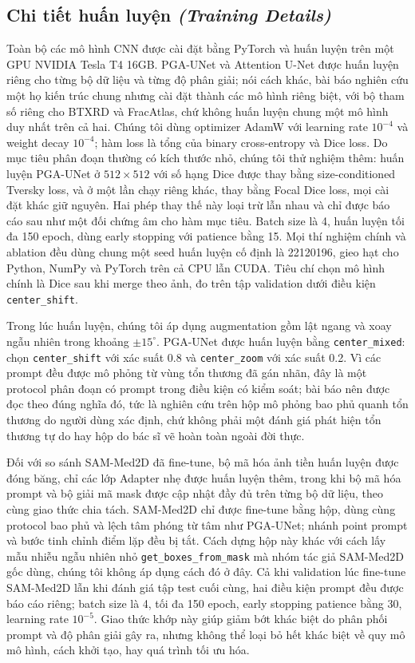 \documentclass[11pt]{article}
\newcommand{\enlabel}[1]{{\small\itshape\color{gray} (#1)}}
\begin{document}
\subsection{Chi tiết huấn luyện \enlabel{Training Details}}
\label{sec:training}
Toàn bộ các mô hình CNN được cài đặt bằng PyTorch và huấn luyện trên một GPU NVIDIA Tesla T4 16GB. PGA-UNet và Attention U-Net được huấn luyện riêng cho từng bộ dữ liệu và từng độ phân giải; nói cách khác, bài báo nghiên cứu một họ kiến trúc chung nhưng cài đặt thành các mô hình riêng biệt, với bộ tham số riêng cho BTXRD và FracAtlas, chứ không huấn luyện chung một mô hình duy nhất trên cả hai. Chúng tôi dùng optimizer AdamW với learning rate $10^{-4}$ và weight decay $10^{-4}$; hàm loss là tổng của binary cross-entropy và Dice loss. Do mục tiêu phân đoạn thường có kích thước nhỏ, chúng tôi thử nghiệm thêm: huấn luyện PGA-UNet ở $512\times512$ với số hạng Dice được thay bằng size-conditioned Tversky loss, và ở một lần chạy riêng khác, thay bằng Focal Dice loss, mọi cài đặt khác giữ nguyên. Hai phép thay thế này loại trừ lẫn nhau và chỉ được báo cáo sau như một đối chứng âm cho hàm mục tiêu. Batch size là 4, huấn luyện tối đa 150 epoch, dùng early stopping với patience bằng 15. Mọi thí nghiệm chính và ablation đều dùng chung một seed huấn luyện cố định là 22120196, gieo hạt cho Python, NumPy và PyTorch trên cả CPU lẫn CUDA. Tiêu chí chọn mô hình chính là Dice sau khi merge theo ảnh, đo trên tập validation dưới điều kiện \texttt{center\_shift}.

Trong lúc huấn luyện, chúng tôi áp dụng augmentation gồm lật ngang và xoay ngẫu nhiên trong khoảng $\pm15^\circ$. PGA-UNet được huấn luyện bằng \texttt{center\_mixed}: chọn \texttt{center\_shift} với xác suất 0.8 và \texttt{center\_zoom} với xác suất 0.2. Vì các prompt đều được mô phỏng từ vùng tổn thương đã gán nhãn, đây là một protocol phân đoạn có prompt trong điều kiện có kiểm soát; bài báo nên được đọc theo đúng nghĩa đó, tức là nghiên cứu trên hộp mô phỏng bao phủ quanh tổn thương do người dùng xác định, chứ không phải một đánh giá phát hiện tổn thương tự do hay hộp do bác sĩ vẽ hoàn toàn ngoài đời thực.

Đối với so sánh SAM-Med2D đã fine-tune, bộ mã hóa ảnh tiền huấn luyện được đóng băng, chỉ các lớp Adapter nhẹ được huấn luyện thêm, trong khi bộ mã hóa prompt và bộ giải mã mask được cập nhật đầy đủ trên từng bộ dữ liệu, theo cùng giao thức chia tách. SAM-Med2D chỉ được fine-tune bằng hộp, dùng cùng protocol bao phủ và lệch tâm phóng từ tâm như PGA-UNet; nhánh point prompt và bước tinh chỉnh điểm lặp đều bị tắt. Cách dựng hộp này khác với cách lấy mẫu nhiễu ngẫu nhiên nhỏ \texttt{get\_boxes\_from\_mask} mà nhóm tác giả SAM-Med2D gốc dùng, chúng tôi không áp dụng cách đó ở đây. Cả khi validation lúc fine-tune SAM-Med2D lẫn khi đánh giá tập test cuối cùng, hai điều kiện prompt đều được báo cáo riêng; batch size là 4, tối đa 150 epoch, early stopping patience bằng 30, learning rate $10^{-5}$. Giao thức khớp này giúp giảm bớt khác biệt do phân phối prompt và độ phân giải gây ra, nhưng không thể loại bỏ hết khác biệt về quy mô mô hình, cách khởi tạo, hay quá trình tối ưu hóa.
\end{document}
